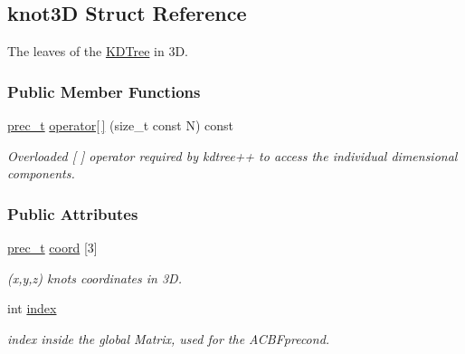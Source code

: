 \hypertarget{structknot3D}{
\subsection{knot3D Struct Reference}
\label{structknot3D}
}
The leaves of the \hyperlink{namespaceKDTree}{KDTree} in 3D.  


\subsubsection*{Public Member Functions}
\begin{CompactItemize}
\item 
\hyperlink{Traits_8hpp_81f62fadeebafe942380746e380c72a5}{prec\_\-t} \hyperlink{structknot3D_6509aed0744e1edc9bab30e261ae3816}{operator\mbox{[}$\,$\mbox{]}} (size\_\-t const N) const 
\begin{CompactList}\small\item\em Overloaded \mbox{[} \mbox{]} operator required by kdtree++ to access the individual dimensional components. \item\end{CompactList}\end{CompactItemize}
\subsubsection*{Public Attributes}
\begin{CompactItemize}
\item 
\hypertarget{structknot3D_24d87ef1ccb8cda204751aab9add7c64}{
\hyperlink{Traits_8hpp_81f62fadeebafe942380746e380c72a5}{prec\_\-t} \hyperlink{structknot3D_24d87ef1ccb8cda204751aab9add7c64}{coord} \mbox{[}3\mbox{]}}
\label{structknot3D_24d87ef1ccb8cda204751aab9add7c64}

\begin{CompactList}\small\item\em (x,y,z) knots coordinates in 3D. \item\end{CompactList}\item 
\hypertarget{structknot3D_f87ca081abf267afdcd926f0dcef910b}{
int \hyperlink{structknot3D_f87ca081abf267afdcd926f0dcef910b}{index}}
\label{structknot3D_f87ca081abf267afdcd926f0dcef910b}

\begin{CompactList}\small\item\em index inside the global Matrix, used for the ACBFprecond. \item\end{CompactList}\end{CompactItemize}


